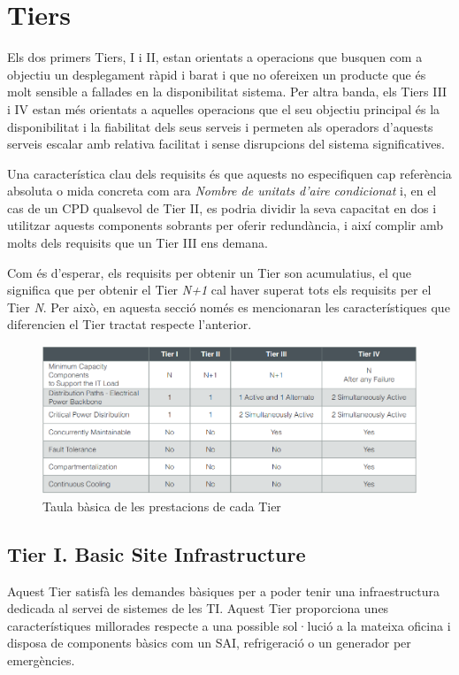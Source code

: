 \documentclass[11pt,a4paper,titlepage]{article}
\begin{document}
    \section{Tiers}
    Els dos primers Tiers, I i II, estan orientats a operacions que busquen com a objectiu un desplegament ràpid i barat i que no ofereixen un producte que és molt sensible a fallades en la disponibilitat sistema. Per altra banda, els Tiers III i IV estan més orientats a aquelles operacions que el seu objectiu principal és la disponibilitat i la fiabilitat dels seus serveis i permeten als operadors d'aquests serveis escalar amb relativa facilitat i sense disrupcions del sistema significatives.
    
    Una característica clau dels requisits és que aquests no especifiquen cap referència absoluta o mida concreta com ara \textit{Nombre de unitats d'aire condicionat} i, en el cas de un CPD qualsevol de Tier II, es podria dividir la seva capacitat en dos i utilitzar aquests components sobrants per oferir redundància, i així complir amb molts dels requisits que un Tier III ens demana.
    
    Com és d'esperar, els requisits per obtenir un Tier son acumulatius, el que significa que per obtenir el Tier \textit{N+1} cal haver superat tots els requisits per el Tier \textit{N}. Per això, en aquesta secció només es mencionaran les característiques que diferencien el Tier tractat respecte l'anterior.
    
\begin{figure}[h]
    \centering
    \includegraphics[width=12cm]{Tier requirement list.png}
    \caption{Taula bàsica de les prestacions de cada Tier}
    \label{fig:Tier_req_sum}
\end{figure}
    
    \subsection{Tier I. Basic Site Infrastructure}
    Aquest Tier satisfà les demandes bàsiques per a poder tenir una infraestructura dedicada al servei de sistemes de les TI. Aquest Tier proporciona unes característiques millorades respecte a una possible sol·lució a la mateixa oficina i disposa de components bàsics com un SAI, refrigeració o un generador per emergències.
    
\end{document}
